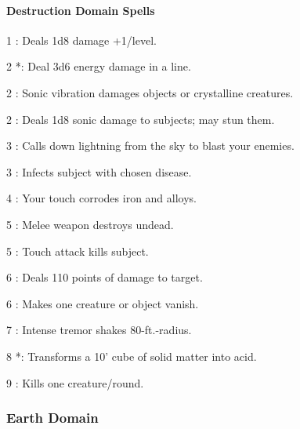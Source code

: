 \paragraph{Destruction Domain Spells}
\begin{list}{}{\leftmargin=1em}
\item[1] : Deals 1d8 damage +1/level.
\item[2] *: Deal 3d6 energy damage in a line.
\item[2] : Sonic vibration damages objects or crystalline creatures.
\item[2] : Deals 1d8 sonic damage to subjects; may stun them.
\item[3] : Calls down lightning from the sky to blast your enemies.
\item[3] : Infects subject with chosen disease.
\item[4] : Your touch corrodes iron and alloys.
\item[5] : Melee weapon destroys undead.
\item[5] : Touch attack kills subject.
\item[6] : Deals 110 points of damage to target.
\item[6] : Makes one creature or object vanish.
\item[7] : Intense tremor shakes 80-ft.-radius.
\item[8] *: Transforms a 10' cube of solid matter into acid.
\item[9] : Kills one creature/round.
\end{list}
\subsubsection{Earth Domain}
